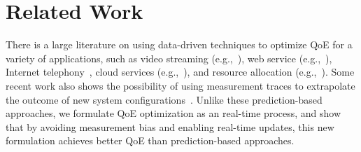 \section{Related Work}
\label{sec:pytheas:related}


There is a large literature on using data-driven techniques to optimize QoE for a variety of applications,
such as video streaming (e.g.,~\cite{c3,cfa}), web service (e.g.,~\cite{footprint,spand}), Internet telephony~\cite{rewan-hotnets2015,via}, cloud services (e.g.,~\cite{lacurts2014cicada}), and resource allocation (e.g.,~\cite{bao2015data}). 
Some recent work also shows the possibility of using measurement traces to extrapolate the outcome of new system configurations~\cite{mwt}.
Unlike these prediction-based approaches, we formulate QoE optimization as an real-time \mab process, and show that by avoiding measurement bias and enabling real-time updates, this new formulation achieves better QoE than prediction-based approaches.


